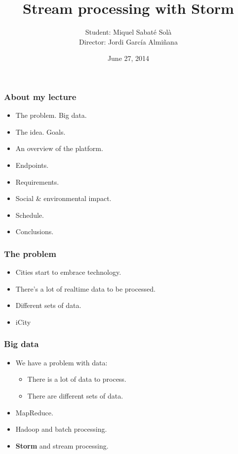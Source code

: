 \documentclass[12pt]{beamer}
\title{Stream processing with Storm}
\author{Student: Miquel Sabaté Solà \\ Director: Jordi García Almiñana}
\date{June 27, 2014}
\begin{document}
\frame{\titlepage}


\begin{frame}
\vfill
  \frametitle{About my lecture}
  \begin{itemize}
    \item The problem. Big data.
    \vfill
    \item The idea. Goals.
    \vfill
    \item An overview of the platform.
    \vfill
    \item Endpoints.
    \vfill
    \item Requirements.
    \vfill
    \item Social \& environmental impact.
    \vfill
    \item Schedule.
    \vfill
    \item Conclusions.
  \end{itemize}
\vfill
\end{frame}

\begin{frame}
\vfill
  \frametitle{The problem}
  \begin{itemize}
    \item Cities start to embrace technology.
    \vfill
    \item There's a lot of realtime data to be processed.
    \vfill
    \item Different sets of data.
    \vfill
    \item iCity
    \vfill
  \end{itemize}
\vfill
\end{frame}

\begin{frame}
\vfill
  \frametitle{Big data}
  \begin{itemize}
    \item We have a problem with data:
    \vfill
    \begin{itemize}
      \item There is a lot of data to process.
      \vfill
      \item There are different sets of data.
    \end{itemize}
    \vfill
    \item MapReduce.
    \vfill
    \item Hadoop and batch processing.
    \vfill
    \item {\bf Storm} and stream processing.
    \vfill
  \end{itemize}
\vfill
\end{frame}
\end{document}
